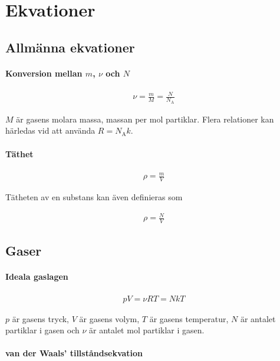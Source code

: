 \section{Ekvationer}

\subsection{Allmänna ekvationer}

\paragraph{Konversion mellan $m$, $\nu$ och $N$}

\begin{align*}
	\nu = \frac{m}{M} = \frac{N}{N_\text{A}}
\end{align*}

$M$ är gasens molara massa, massan per mol partiklar. Flera relationer kan härledas vid att använda $R = N_\text{A}k$.

\paragraph{Täthet}

\begin{align*}
	\rho = \frac{m}{V}
\end{align*}

Tätheten av en substans kan även definieras som

\begin{align*}
	\rho = \frac{N}{V}
\end{align*}

\subsection{Gaser}

\paragraph{Ideala gaslagen}

\begin{align*}
	pV = \nu RT = NkT
\end{align*}

$p$ är gasens tryck, $V$ är gasens volym, $T$ är gasens temperatur, $N$ är antalet partiklar i gasen och $\nu$ är antalet mol partiklar i gasen.

\paragraph{van der Waals' tillståndsekvation}


